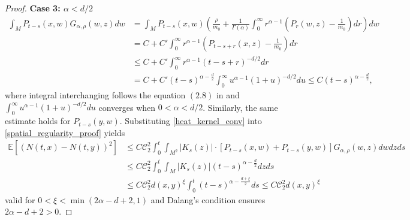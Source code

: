 \documentclass[12pt]{amsart}
\numberwithin{equation}{section}
\newcommand{\1}{\mathbf{1}}
\begin{document}
\begin{proof}
\textbf{Case 3: $\alpha<d/2$}
\begin{equation}
\label{heat_kernel_conv}
\begin{split}
        \int_MP_{t-s}(x,w)G_{\alpha,\rho}(w,z)dw&=\int_MP_{t-s}(x,w)\left(\frac{\rho}{m_0}+\frac{1}{\Gamma(\alpha)}\int_0^\infty r^{\alpha-1} \left(P_r(w,z)-\frac{1}{m_0}\right)dr\right)dw\\
        &=C+C'\int_0^\infty r^{\alpha-1}\left(P_{t-s+r}(x,z)-\frac{1}{m_0}\right)dr\\
        &\leq C+C'\int_0^\infty r^{\alpha-1}(t-s+r)^{-d/2}dr\\
        &=C+C'(t-s)^{\alpha-\frac{d}{2}}\int_0^\infty u^{\alpha-1}(1+u)^{-d/2}du\leq C(t-s)^{\alpha-\frac{d}{2}},
\end{split}
\end{equation}
where integral interchanging follows the equation $(2.8)$ in \cite{brosamler1983laws} and $\int_0^\infty u^{\alpha-1}(1+u)^{-d/2}du$ converges when $0<\alpha<d/2$. Similarly, the same estimate holds for $P_{t-s}(y,w)$. Substituting \eqref{heat_kernel_conv} into \eqref{spatial_regularity_proof} yields
\begin{equation*}
\begin{split}
        \mathbb{E}\left[(N(t,x)-N(t,y))^2\right]&\leq C\mathcal{C}_2^2\int_0^t\int_{M^2}\vert K_s(z)\vert\cdot[P_{t-s}(x,w)+P_{t-s}(y,w)]G_{\alpha,\rho}(w,z)dwdzds\\
        &\leq C\mathcal{C}_2^2\int_0^t\int_{M}\vert K_s(z)\vert(t-s)^{\alpha-\frac{d}{2}}dzds\\
        &\leq C\mathcal{C}_2^2d(x,y)^\xi\int_0^t(t-s)^{\alpha-\frac{d+\xi}{2}}ds\leq C\mathcal{C}_2^2d(x,y)^\xi
\end{split}
\end{equation*}
valid for $0 < \xi < \min(2\alpha-d+2,1)$ and Dalang's condition ensures $2\alpha-d+2>0$.
\end{proof}
\end{document}
